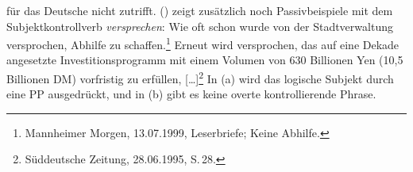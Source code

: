 für das Deutsche nicht zutrifft.
() zeigt zusätzlich noch Passivbeispiele mit dem Subjektkontrollverb
        \emph{versprechen}:
\eal
\ex 
Wie oft schon wurde von der Stadtverwaltung versprochen, Abhilfe zu schaffen.\footnote{
        Mannheimer Morgen, 13.07.1999, Leserbriefe; Keine Abhilfe.%
}
\ex Erneut wird versprochen, das auf eine Dekade angesetzte Investitionsprogramm mit einem Volumen von 630 Billionen Yen (10,5
Billionen DM) vorfristig zu erfüllen, [\ldots]\footnote{
    Süddeutsche Zeitung, 28.06.1995, S.\,28.%
}
%
\zl
In (a) wird das logische Subjekt durch eine PP ausgedrückt, und in (b) 
gibt es keine overte kontrollierende Phrase.
%
%



